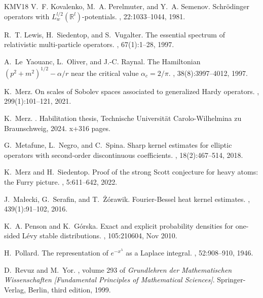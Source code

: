 \documentclass[12pt,reqno]{amsart}
\theoremstyle{definition}
\theoremstyle{remark}
\numberwithin{equation}{section}
\newcommand{\1}{\mathbbm{1}}
\begin{document}
\begin{thebibliography}{KMV{\etalchar{+}}18}
V.~F. Kovalenko, M.~A. Perelmuter, and Y.~A. Semenov.
\newblock Schr\"odinger operators with ${L}_w^{l/2}(\mathbb{R}^l)$-potentials.
, 22:1033--1044, 1981.

R.~T. Lewis, H.~Siedentop, and S.~Vugalter.
\newblock The essential spectrum of relativistic multi-particle operators.
, 67(1):1--28, 1997.

A.~Le~Yaouanc, L.~Oliver, and J.-C. Raynal.
\newblock The {H}amiltonian {$(p^2+m^2)^{1/2}-\alpha/r$} near the critical
  value {$\alpha_c=2/\pi$}.
, 38(8):3997--4012, 1997.

K.~Merz.
\newblock On scales of {S}obolev spaces associated to generalized {H}ardy
  operators.
, 299(1):101--121, 2021.

K.~Merz.
.
\newblock Habilitation thesis, Technische Universit{\"a}t Carolo-Wilhelmina zu
  Braunschweig, 2024.
\newblock x+316 pages.

G.~Metafune, L.~Negro, and C.~Spina.
\newblock Sharp kernel estimates for elliptic operators with second-order
  discontinuous coefficients.
, 18(2):467--514, 2018.

K.~Merz and H.~Siedentop.
\newblock Proof of the strong {Scott} conjecture for heavy atoms: the {Furry}
  picture.
, 5:611--642, 2022.

J.~Ma{\l}ecki, G.~Serafin, and T.~{\.Z}{\'o}rawik.
\newblock Fourier-{B}essel heat kernel estimates.
, 439(1):91--102, 2016.

K.~A. Penson and K.~G\'orska.
\newblock Exact and explicit probability densities for one-sided {L}\'evy
  stable distributions.
, 105:210604, Nov 2010.

H.~Pollard.
\newblock The representation of {$e^{-x^{\lambda}}$} as a {L}aplace integral.
, 52:908--910, 1946.

D.~Revuz and M.~Yor.
, volume 293 of
  {\em Grundlehren der Mathematischen Wissenschaften [Fundamental Principles of
  Mathematical Sciences]}.
\newblock Springer-Verlag, Berlin, third edition, 1999.


\end{thebibliography}
\end{document}
